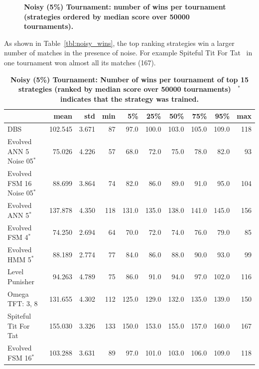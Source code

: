\documentclass[10pt,letterpaper]{article}
\begin{document}
\begin{figure}[!hbtp]
    \centering
    \caption{\bf Noisy (5\%) Tournament: number of wins per tournament
        (strategies ordered by median score over 50000 tournaments).}
    \label{fig:noisy_winplot}
\end{figure}

As shown in Table~\ref{tbl:noisy_wins}, the top ranking strategies win a larger
number of matches in the presence of noise. For example Spiteful Tit For Tat~\cite{Prison1998}
in one tournament won almost all its matches (167).

\begin{table}[!hbtp]
    \centering
        \caption{\bf Noisy (5\%) Tournament: Number of wins per tournament
        of top 15 strategies (ranked by median score over
        50000 tournaments)
        ~$^{*}$ indicates that the strategy was trained.}
        \footnotesize
\begin{tabular}{lrrrrrrrrr}
\toprule
{} &     mean &    std &  min &     5\% &    25\% &    50\% &    75\% &    95\% &  max \\
\midrule
DBS                              &  102.545 &  3.671 &   87 &   97.0 &  100.0 &  103.0 &  105.0 &  109.0 &  118 \\
Evolved ANN 5 Noise 05$^{*}$     &   75.026 &  4.226 &   57 &   68.0 &   72.0 &   75.0 &   78.0 &   82.0 &   93 \\
Evolved FSM 16 Noise 05$^{*}$    &   88.699 &  3.864 &   74 &   82.0 &   86.0 &   89.0 &   91.0 &   95.0 &  104 \\
Evolved ANN 5$^{*}$              &  137.878 &  4.350 &  118 &  131.0 &  135.0 &  138.0 &  141.0 &  145.0 &  156 \\
Evolved FSM 4$^{*}$              &   74.250 &  2.694 &   64 &   70.0 &   72.0 &   74.0 &   76.0 &   79.0 &   85 \\
Evolved HMM 5$^{*}$              &   88.189 &  2.774 &   77 &   84.0 &   86.0 &   88.0 &   90.0 &   93.0 &   99 \\
Level Punisher                   &   94.263 &  4.789 &   75 &   86.0 &   91.0 &   94.0 &   97.0 &  102.0 &  116 \\
Omega TFT: 3, 8                  &  131.655 &  4.302 &  112 &  125.0 &  129.0 &  132.0 &  135.0 &  139.0 &  150 \\
Spiteful Tit For Tat             &  155.030 &  3.326 &  133 &  150.0 &  153.0 &  155.0 &  157.0 &  160.0 &  167 \\
Evolved FSM 16$^{*}$             &  103.288 &  3.631 &   89 &   97.0 &  101.0 &  103.0 &  106.0 &  109.0 &  118 \\

\end{tabular}
\end{table}
\end{document}
